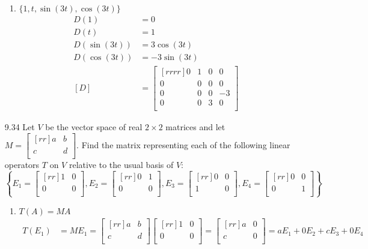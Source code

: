 \documentclass[12pt]{article}
\theoremstyle{definition}
\theoremstyle{plain}
\begin{document}
\begin{enumerate}
\begin{enumerate}
	\item $\{1,t,\sin(3t),\cos(3t)\}$
		\begin{align*}
		D(1)&=0\\
		D(t)&=1\\
		D(\sin(3t))&=3\cos(3t)\\
		D(\cos(3t))&=-3\sin(3t)\\
		[D] &= \begin{bmatrix}[rrrr]0&1&0&0\\0&0&0&0\\0&0&0&-3\\0&0&3&0\\\end{bmatrix}
		\end{align*}
	\end{enumerate}
\item[9.34]Let $V$ be the vector space of real $2\times2$ matrices and let $M=\begin{bmatrix}[rr]a&b\\c&d\\\end{bmatrix}$. Find the matrix representing each of the following linear operators $T$ on $V$ relative to the usual basis of $V$:
\[ \left\{ E_1=\begin{bmatrix}[rr]1&0\\0&0\\\end{bmatrix}, E_2=\begin{bmatrix}[rr]0&1\\0&0\\\end{bmatrix}, E_3=\begin{bmatrix}[rr]0&0\\1&0\\\end{bmatrix},E_4=\begin{bmatrix}[rr]0&0\\0&1\\\end{bmatrix} \right\} \]
	\begin{enumerate}
	\item $T(A)=MA$
		\begin{align*}
		T(E_1)&=ME_1 = \begin{bmatrix}[rr]a&b\\c&d\\\end{bmatrix}\begin{bmatrix}[rr]1&0\\0&0\\\end{bmatrix} = \begin{bmatrix}[rr]a&0\\c&0\\\end{bmatrix} = aE_1+0E_2+cE_3+0E_4\\

\end{align*}
\end{enumerate}
\end{enumerate}
\end{document}
